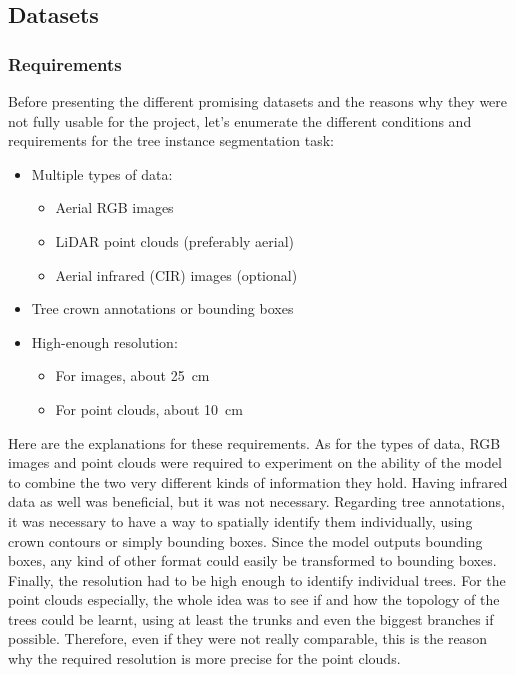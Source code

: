\documentclass[
  letterpaper,
  DIV=11,
  numbers=noendperiod]{scrartcl}
\providecommand{\tightlist}{%
  \setlength{\itemsep}{0pt}\setlength{\parskip}{0pt}}\usepackage{longtable,booktabs,array}
\begin{document}
\subsection{Datasets}\label{datasets}

\subsubsection{Requirements}\label{sec-sota-datasets-requirements}

Before presenting the different promising datasets and the reasons why
they were not fully usable for the project, let's enumerate the
different conditions and requirements for the tree instance segmentation
task:

\begin{itemize}
\tightlist
\item
  Multiple types of data:

  \begin{itemize}
  \tightlist
  \item
    Aerial RGB images
  \item
    LiDAR point clouds (preferably aerial)
  \item
    Aerial infrared (CIR) images (optional)
  \end{itemize}
\item
  Tree crown annotations or bounding boxes
\item
  High-enough resolution:

  \begin{itemize}
  \tightlist
  \item
    For images, about 25~cm
  \item
    For point clouds, about 10~cm
  \end{itemize}
\end{itemize}

Here are the explanations for these requirements. As for the types of
data, RGB images and point clouds were required to experiment on the
ability of the model to combine the two very different kinds of
information they hold. Having infrared data as well was beneficial, but
it was not necessary. Regarding tree annotations, it was necessary to
have a way to spatially identify them individually, using crown contours
or simply bounding boxes. Since the model outputs bounding boxes, any
kind of other format could easily be transformed to bounding boxes.
Finally, the resolution had to be high enough to identify individual
trees. For the point clouds especially, the whole idea was to see if and
how the topology of the trees could be learnt, using at least the trunks
and even the biggest branches if possible. Therefore, even if they were
not really comparable, this is the reason why the required resolution is
more precise for the point clouds.
\end{document}
